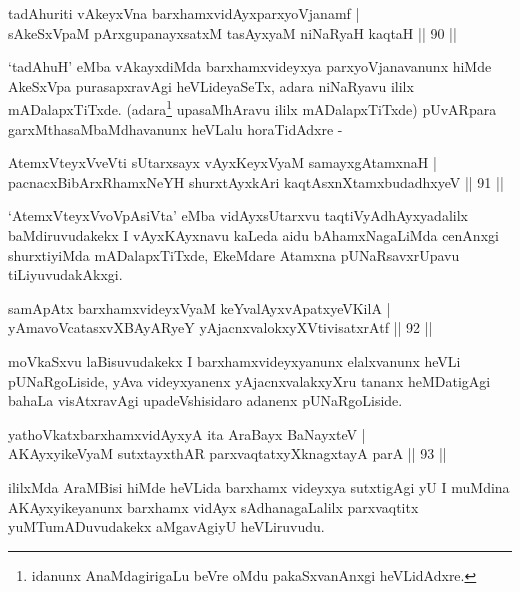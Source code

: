\begin{shl}
tadAhuriti vAkeyxVna barxhamxvidAyxparxyoVjanamf |\\
sAkeSxVpaM pArxgupanayxsatxM tasAyxyaM niNaRyaH kaqtaH \hfill || 90 ||
\end{shl}

\begin{artha}
`tadAhuH' eMba vAkayxdiMda barxhamxvideyxya parxyoVjanavanunx hiMde
  AkeSxVpa purasapxravAgi heVLideyaSeTx, adara niNaRyavu ililx
  mADalapxTiTxde. (adara\footnote[1]{idanunx AnaMdagirigaLu beVre oMdu
  pakaSxvanAnxgi heVLidAdxre.} upasaMhAravu ililx
  mADalapxTiTxde) pUvARpara garxMthasaMbaMdhavanunx heVLalu
  horaTidAdxre -
\end{artha}

\begin{shl}
AtemxVteyxVveVti sUtarxsayx vAyxKeyxVyaM samayxgAtamxnaH |\\
pacnacxBibArxRhamxNeYH shurxtAyx\s kAri kaqtAsxnXtamxbudadhxyeV \hfill || 91 ||
\end{shl}

\begin{artha}
`AtemxVteyxVvoVpAsiVta' eMba vidAyxsUtarxvu taqtiVyAdhAyxyadalilx baMdiruvudakekx I   vAyxKAyxnavu kaLeda aidu bAhamxNagaLiMda cenAnxgi shurxtiyiMda   mADalapxTiTxde, EkeMdare Atamxna pUNaRsavxrUpavu tiLiyuvudakAkxgi.
\end{artha}

\begin{shl}
samApAtx barxhamxvideyxVyaM keYvalAyxvApatxyeV\s KilA |\\
yAmavoVcatasxvXBAyARyeY yAjacnxvalokxyXV\s tivisatxrAtf \hfill || 92 ||
\end{shl}

\begin{artha}
moVkaSxvu laBisuvudakekx I barxhamxvideyxyanunx elalxvanunx heVLi pUNaRgoLiside, yAva videyxyanenx yAjacnxvalakxyXru tananx heMDatigAgi bahaLa visAtxravAgi upadeVshisidaro adanenx pUNaRgoLiside.
\end{artha}

\begin{shl}
yathoVkatxbarxhamxvidAyxyA ita AraBayx BaNayxteV |\\
AKAyxyikeVyaM sutxtayxthAR parxvaqtatxyXknagxtayA parA \hfill || 93 ||
\end{shl}

\begin{artha}
ililxMda AraMBisi hiMde heVLida barxhamx videyxya sutxtigAgi yU I muMdina AKAyxyikeyanunx barxhamx vidAyx sAdhanagaLalilx parxvaqtitx yuMTumADuvudakekx aMgavAgiyU heVLiruvudu.
\end{artha}

